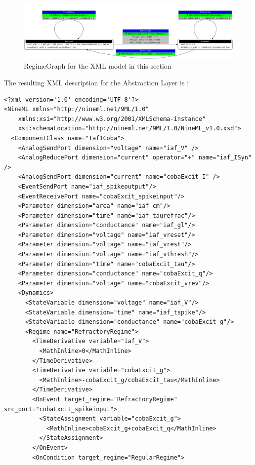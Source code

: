 \documentclass[draftspec]{ninemlspec}
\begin{document}
\begin{figure}[htb!]
\center
\includegraphics[width=14cm]{figures/demo2_Coba1_trnasition.pdf}
\protect\caption{RegimeGraph for the XML model in this section}
\label{fig:EX2_trans}
\end{figure}
\clearpage
The resulting XML description for the Abstraction Layer is :
\begin{lstlisting}[label=code:xmliaf2]
<?xml version='1.0' encoding='UTF-8'?>
<NineML xmlns="http://nineml.net/9ML/1.0"
    xmlns:xsi="http://www.w3.org/2001/XMLSchema-instance"
    xsi:schemaLocation="http://nineml.net/9ML/1.0/NineML_v1.0.xsd">
  <ComponentClass name="Iaf1Coba">
    <AnalogSendPort dimension="voltage" name="iaf_V" />
    <AnalogReducePort dimension="current" operator="+" name="iaf_ISyn" />
    <AnalogSendPort dimension="current" name="cobaExcit_I" />
    <EventSendPort name="iaf_spikeoutput"/>
    <EventReceivePort name="cobaExcit_spikeinput"/>
    <Parameter dimension="area" name="iaf_cm"/>
    <Parameter dimension="time" name="iaf_taurefrac"/>
    <Parameter dimension="conductance" name="iaf_gl"/>
    <Parameter dimension="voltage" name="iaf_vreset"/>
    <Parameter dimension="voltage" name="iaf_vrest"/>
    <Parameter dimension="voltage" name="iaf_vthresh"/>
    <Parameter dimension="time" name="cobaExcit_tau"/>
    <Parameter dimension="conductance" name="cobaExcit_q"/>
    <Parameter dimension="voltage" name="cobaExcit_vrev"/>
    <Dynamics>
      <StateVariable dimension="voltage" name="iaf_V"/>
      <StateVariable dimension="time" name="iaf_tspike"/>
      <StateVariable dimension="conductance" name="cobaExcit_g"/>
      <Regime name="RefractoryRegime">
        <TimeDerivative variable="iaf_V">
          <MathInline>0</MathInline>
        </TimeDerivative>
        <TimeDerivative variable="cobaExcit_g">
          <MathInline>-cobaExcit_g/cobaExcit_tau</MathInline>
        </TimeDerivative>
        <OnEvent target_regime="RefractoryRegime" src_port="cobaExcit_spikeinput">
          <StateAssignment variable="cobaExcit_g">
            <MathInline>cobaExcit_g+cobaExcit_q</MathInline>
          </StateAssignment>
        </OnEvent>
        <OnCondition target_regime="RegularRegime">

\end{lstlisting}
\end{document}
